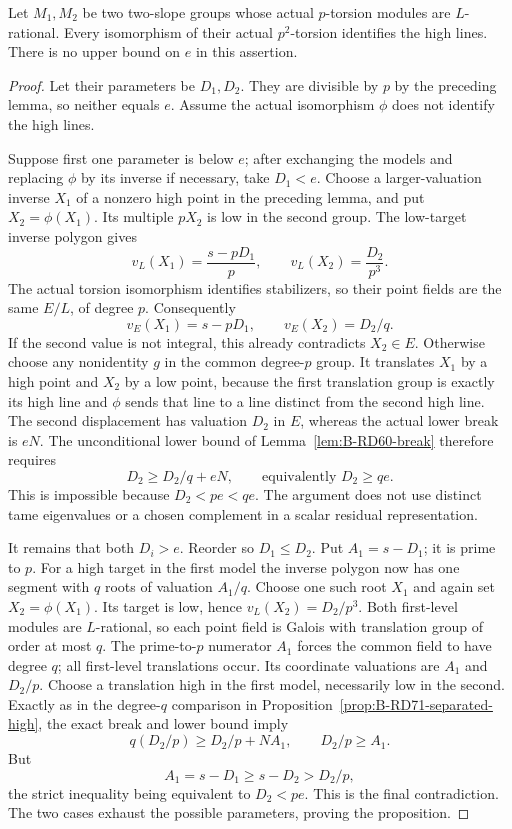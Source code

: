 \begin{proposition}
\label{prop:B-RD73-high-recovery}
Let \(M_1,M_2\) be two two-slope groups whose actual
\(p\)-torsion modules are \(L\)-rational. Every isomorphism of
their actual \(p^2\)-torsion identifies the high lines.
There is no upper bound on \(e\) in this assertion.
\end{proposition}
\begin{proof}
Let their parameters be \(D_1,D_2\).
They are divisible by \(p\) by the preceding lemma, so neither
equals \(e\). Assume the actual isomorphism \(\phi\) does not
identify the high lines.

Suppose first one parameter is below \(e\); after exchanging
the models and replacing \(\phi\) by its inverse if necessary,
take \(D_1<e\). Choose a larger-valuation inverse \(X_1\) of a
nonzero high point in the preceding lemma, and put \(X_2=\phi(X_1)\).
Its multiple \(pX_2\) is low in the second group. The low-target
inverse polygon gives
\[
 v_L(X_1)=\frac{s-pD_1}{p},\qquad
 v_L(X_2)=\frac{D_2}{p^3}.
 \tag{B-RD73.6}
\]
The actual torsion isomorphism identifies stabilizers, so their
point fields are the same \(E/L\), of degree \(p\).
Consequently
\[
 v_E(X_1)=s-pD_1,\qquad v_E(X_2)=D_2/q.
 \tag{B-RD73.7}
\]
If the second value is not integral, this already contradicts
\(X_2\in E\). Otherwise choose any nonidentity \(g\) in the
common degree-\(p\) group. It translates \(X_1\) by a high
point and \(X_2\) by a low point, because the first translation
group is exactly its high line and \(\phi\) sends that line
to a line distinct from the second high line.
The second displacement has valuation \(D_2\) in \(E\),
whereas the actual lower break is \(eN\). The unconditional
lower bound of Lemma~\ref{lem:B-RD60-break} therefore requires
\[
 D_2\ge D_2/q+eN,
 \qquad\text{equivalently }D_2\ge qe.
 \tag{B-RD73.8}
\]
This is impossible because \(D_2<pe<qe\).
The argument does not use distinct tame eigenvalues or a chosen
complement in a scalar residual representation.

It remains that both \(D_i>e\). Reorder so \(D_1\le D_2\).
Put \(A_1=s-D_1\); it is prime to \(p\).
For a high target in the first model the inverse polygon now
has one segment with \(q\) roots of valuation \(A_1/q\).
Choose one such root \(X_1\) and again set \(X_2=\phi(X_1)\).
Its target is low, hence \(v_L(X_2)=D_2/p^3\).
Both first-level modules are \(L\)-rational, so each point
field is Galois with translation group of order at most \(q\).
The prime-to-\(p\) numerator \(A_1\) forces the common field
to have degree \(q\); all first-level translations occur.
Its coordinate valuations are \(A_1\) and \(D_2/p\).
Choose a translation high in the first model, necessarily low
in the second. Exactly as in the degree-\(q\) comparison in
Proposition~\ref{prop:B-RD71-separated-high}, the exact break
and lower bound imply
\[
 q(D_2/p)\ge D_2/p+N A_1,
 \qquad D_2/p\ge A_1.
 \tag{B-RD73.9}
\]
But
\[
 A_1=s-D_1\ge s-D_2>D_2/p,
\]
the strict inequality being equivalent to \(D_2<pe\).
This is the final contradiction. The two cases exhaust the
possible parameters, proving the proposition.
\end{proof}

